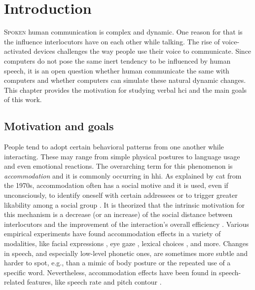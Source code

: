 \chapter{Introduction}
\label{chap:introduction}

\lettrine{S}{poken} human communication is complex and dynamic.
One reason for that is the influence interlocutors have on each other while talking.
The rise of voice-activated devices challenges the way people use their voice to communicate.
Since computers do not pose the same inert tendency to be influenced by human speech, it is an open question whether human communicate the same with computers and whether computers can simulate these natural dynamic changes.
This chapter provides the motivation for studying verbal \acl{hci} and the main goals of this work.

\pagebreak

\acresetall

\section{Motivation and goals}
\label{sec:motivation_and_goals}

People tend to adopt certain behavioral patterns from one another while interacting.
These may range from simple physical postures to language usage and even emotional reactions.
The overarching term for this phenomenon is \emph{accommodation} and it is commonly occurring in \acl{hhi}.
As explained by \acl{cat} from the 1970s, accommodation often has a social motive and it is used, even if unconsciously, to identify oneself with certain addressees or to trigger greater likability among a social group \citep{Giles2007CAT}.
It is theorized that the intrinsic motivation for this mechanism is a decrease (or an increase) of the social distance between interlocutors and the improvement of the interaction's overall efficiency \citep{Gallois2015CAT}.
Various empirical experiments have found accommodation effects in a variety of modalities, like facial expressions \citep{Kinsbourne2009embodied}, eye gaze \citep{Leong2017speaker}, lexical choices \citep{Brennan1996lexical}, and more.
Changes in speech, and especially low-level phonetic ones, are sometimes more subtle and harder to spot, e.g., than a mimic of body posture or the repeated use of a specific word.
Nevertheless, accommodation effects have been found in speech-related features, like speech rate \citep{Levitan2011measuring, Local2007phonetic} and pitch contour \citep{Babel2012role}.

